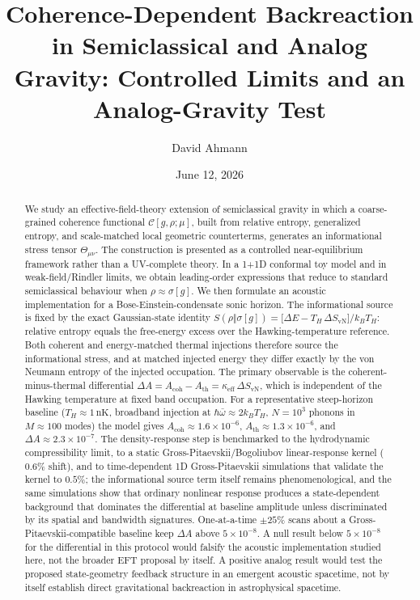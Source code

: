\documentclass[aps,prd,twocolumn,superscriptaddress,nofootinbib,floatfix]{revtex4-2}
\newcommand{\Cfunc}{\mathcal{C}}
\newcommand{\Tmn}{\Theta_{\mu\nu}}
\begin{document}
\title{%
Coherence-Dependent Backreaction in Semiclassical and Analog Gravity: Controlled Limits and an Analog-Gravity Test
}

\author{David Ahmann}

\date{June 12, 2026}


\begin{abstract}
We study an effective-field-theory extension of semiclassical gravity in which a coarse-grained coherence functional $\Cfunc[g,\rho;\mu]$, built from relative entropy, generalized entropy, and scale-matched local geometric counterterms, generates an informational stress tensor $\Tmn$. The construction is presented as a controlled near-equilibrium framework rather than a UV-complete theory. In a 1+1D conformal toy model and in weak-field/Rindler limits, we obtain leading-order expressions that reduce to standard semiclassical behaviour when $\rho \approx \sigma[g]$. We then formulate an acoustic implementation for a Bose-Einstein-condensate sonic horizon. The informational source is fixed by the exact Gaussian-state identity $S(\rho\Vert\sigma[g]) = \big[\Delta E - T_H\,\Delta S_{\mathrm{vN}}\big]/k_B T_H$: relative entropy equals the free-energy excess over the Hawking-temperature reference. Both coherent and energy-matched thermal injections therefore source the informational stress, and at matched injected energy they differ exactly by the von Neumann entropy of the injected occupation. The primary observable is the coherent-minus-thermal differential $\Delta A = A_{\mathrm{coh}} - A_{\mathrm{th}} = \kappa_{\mathrm{eff}}\,\Delta S_{\mathrm{vN}}$, which is independent of the Hawking temperature at fixed band occupation. For a representative steep-horizon baseline ($T_H \approx 1\,\mathrm{nK}$, broadband injection at $\hbar\bar{\omega} \approx 2 k_B T_H$, $N=10^3$ phonons in $M \approx 100$ modes) the model gives $A_{\mathrm{coh}} \approx 1.6\times10^{-6}$, $A_{\mathrm{th}} \approx 1.3\times10^{-6}$, and $\Delta A \approx 2.3\times10^{-7}$. The density-response step is benchmarked to the hydrodynamic compressibility limit, to a static Gross-Pitaevskii/Bogoliubov linear-response kernel ($0.6\%$ shift), and to time-dependent 1D Gross-Pitaevskii simulations that validate the kernel to $0.5\%$; the informational source term itself remains phenomenological, and the same simulations show that ordinary nonlinear response produces a state-dependent background that dominates the differential at baseline amplitude unless discriminated by its spatial and bandwidth signatures. One-at-a-time $\pm25\%$ scans about a Gross-Pitaevskii-compatible baseline keep $\Delta A$ above $5\times10^{-8}$. A null result below $5\times10^{-8}$ for the differential in this protocol would falsify the acoustic implementation studied here, not the broader EFT proposal by itself. A positive analog result would test the proposed state-geometry feedback structure in an emergent acoustic spacetime, not by itself establish direct gravitational backreaction in astrophysical spacetime.

\end{abstract}
\end{document}
